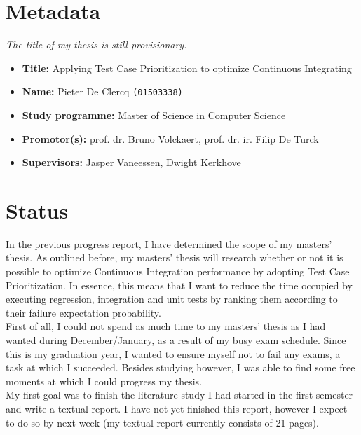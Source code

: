 \newcommand*{\Root}{..}

\renewcommand{\documentdate}{February 16, 2020}
\renewcommand{\documenttitle}{Progress Report 2}


\onehalfspacing
\newpage

\chapter*{Metadata}
\emph{The title of my thesis is still provisionary.}

\begin{itemize}
  \item \textbf{Title:} Applying Test Case Prioritization to optimize Continuous Integrating
  \item \textbf{Name:} Pieter De Clercq \texttt{(01503338)}
  \item \textbf{Study programme:} Master of Science in Computer Science
  \item \textbf{Promotor(s):} prof. dr. Bruno Volckaert, prof. dr. ir. Filip De Turck
  \item \textbf{Supervisors:} Jasper Vaneessen, Dwight Kerkhove
\end{itemize}

\chapter*{Status}
In the previous progress report, I have determined the scope of my masters' thesis. As outlined before, my masters' thesis will research whether or not it is possible to optimize Continuous Integration performance by adopting Test Case Prioritization. In essence, this means that I want to reduce the time occupied by executing regression, integration and unit tests by ranking them according to their failure expectation probability.\\

\noindent First of all, I could not spend as much time to my masters' thesis as I had wanted during December/January, as a result of my busy exam schedule. Since this is my graduation year, I wanted to ensure myself not to fail any exams, a task at which I succeeded. Besides studying however, I was able to find some free moments at which I could progress my thesis.\\

\noindent My first goal was to finish the literature study I had started in the first semester and write a textual report. I have not yet finished this report, however I expect to do so by next week (my textual report currently consists of 21 pages).\\

